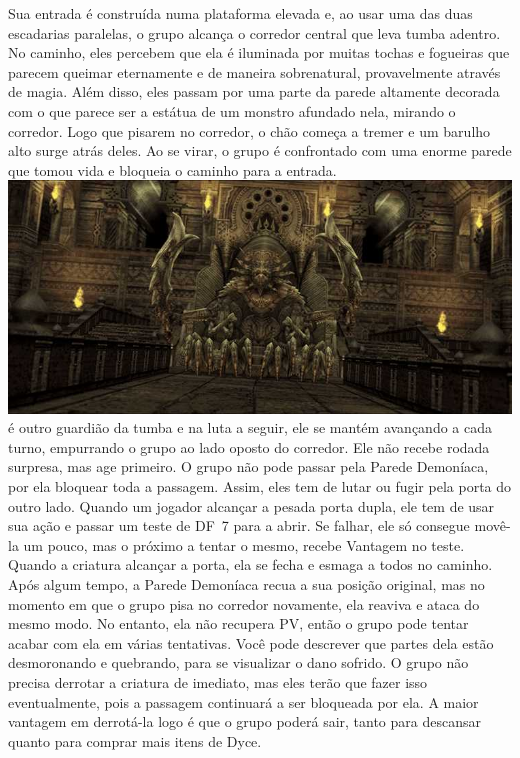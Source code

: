 Sua entrada é construída numa plataforma elevada e, ao usar uma das duas escadarias paralelas, o grupo alcança o corredor central que leva tumba adentro.
No caminho, eles percebem que ela é iluminada por muitas tochas e fogueiras que parecem queimar eternamente e de maneira sobrenatural, provavelmente através de magia.
Além disso, eles passam por uma parte da parede altamente decorada com o que parece ser a estátua de um monstro afundado nela, mirando o corredor.
Logo que pisarem no corredor, o chão começa a tremer e um barulho alto surge atrás deles.
Ao se virar, o grupo é confrontado com uma enorme parede que tomou vida e bloqueia o caminho para a entrada.
%
\vfill
%
\includegraphics[width=\columnwidth]{./art/tombofraithwall/demonwall2.jpg}
%
\newpage
%
 é outro guardião da tumba e na luta a seguir, ele se mantém avançando a cada turno, empurrando o grupo ao lado oposto do corredor.
Ele não recebe rodada surpresa, mas age primeiro.
O grupo não pode passar pela Parede Demoníaca, por ela bloquear toda a passagem. Assim, eles tem de lutar ou fugir pela porta do outro lado.
Quando um jogador alcançar a pesada porta dupla, ele tem de usar sua ação e passar um teste de DF~7 para a abrir.
Se falhar, ele só consegue movê-la um pouco, mas o próximo a tentar o mesmo, recebe Vantagem no teste.
Quando a criatura alcançar a porta, ela se fecha e esmaga a todos no caminho.
Após algum tempo, a Parede Demoníaca recua a sua posição original, mas no momento em que o grupo pisa no corredor novamente, ela reaviva e ataca do mesmo modo.
No entanto, ela não recupera PV, então o grupo pode tentar acabar com ela em várias tentativas.
Você pode descrever que partes dela estão desmoronando e quebrando, para se visualizar o dano sofrido.
O grupo não precisa derrotar a criatura de imediato, mas eles terão que fazer isso eventualmente, pois a passagem continuará a ser bloqueada por ela.
A maior vantagem em derrotá-la logo é que o grupo poderá sair, tanto para descansar quanto para comprar mais itens de Dyce.
